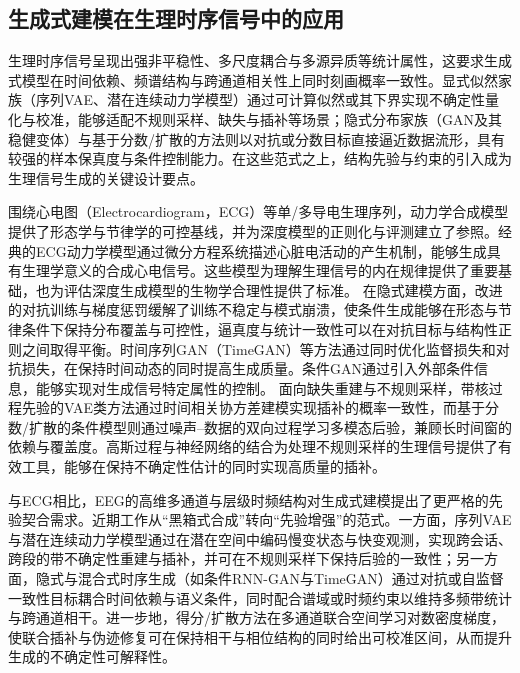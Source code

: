 \subsection{生成式建模在生理时序信号中的应用}
生理时序信号呈现出强非平稳性、多尺度耦合与多源异质等统计属性，这要求生成式模型在时间依赖、频谱结构与跨通道相关性上同时刻画概率一致性\cite{赵雅琴2022基于改进深度生成对抗网络的心电信号重构算法}。显式似然家族（序列VAE、潜在连续动力学模型）通过可计算似然或其下界实现不确定性量化与校准，能够适配不规则采样、缺失与插补等场景；隐式分布家族（GAN及其稳健变体）与基于分数/扩散的方法则以对抗或分数目标直接逼近数据流形，具有较强的样本保真度与条件控制能力\cite{chung2015recurrent,rubanova2019latent,esteban2017real,yoon2019time,gulrajani2017improved,song2021score,tashiro2021csdi}。在这些范式之上，结构先验与约束的引入成为生理信号生成的关键设计要点。

围绕心电图（Electrocardiogram，ECG）等单/多导电生理序列，动力学合成模型提供了形态学与节律学的可控基线，并为深度模型的正则化与评测建立了参照\cite{mcsharry2003dynamical}。经典的ECG动力学模型通过微分方程系统描述心脏电活动的产生机制，能够生成具有生理学意义的合成心电信号。这些模型为理解生理信号的内在规律提供了重要基础，也为评估深度生成模型的生物学合理性提供了标准。
在隐式建模方面，改进的对抗训练与梯度惩罚缓解了训练不稳定与模式崩溃，使条件生成能够在形态与节律条件下保持分布覆盖与可控性\cite{gulrajani2017improved}，逼真度与统计一致性可以在对抗目标与结构性正则之间取得平衡\cite{thambawita2021deepfake}。时间序列GAN（TimeGAN）等方法通过同时优化监督损失和对抗损失，在保持时间动态的同时提高生成质量。条件GAN通过引入外部条件信息，能够实现对生成信号特定属性的控制。
面向缺失重建与不规则采样，带核过程先验的VAE类方法通过时间相关协方差建模实现插补的概率一致性\cite{fortuin2020gp}，而基于分数/扩散的条件模型则通过噪声--数据的双向过程学习多模态后验，兼顾长时间窗的依赖与覆盖度\cite{tashiro2021csdi}。高斯过程与神经网络的结合为处理不规则采样的生理信号提供了有效工具，能够在保持不确定性估计的同时实现高质量的插补。

与ECG相比，EEG的高维多通道与层级时频结构对生成式建模提出了更严格的先验契合需求。近期工作从“黑箱式合成”转向“先验增强”的范式。一方面，序列VAE与潜在连续动力学模型通过在潜在空间中编码慢变状态与快变观测，实现跨会话、跨段的带不确定性重建与插补，并可在不规则采样下保持后验的一致性\cite{chung2015recurrent,rubanova2019latent}；另一方面，隐式与混合式时序生成（如条件RNN-GAN与TimeGAN）通过对抗或自监督一致性目标耦合时间依赖与语义条件，同时配合谱域或时频约束以维持多频带统计与跨通道相干\cite{esteban2017real,yoon2019time}。进一步地，得分/扩散方法在多通道联合空间学习对数密度梯度，使联合插补与伪迹修复可在保持相干与相位结构的同时给出可校准区间，从而提升生成的不确定性可解释性\cite{song2021score,tashiro2021csdi}。

